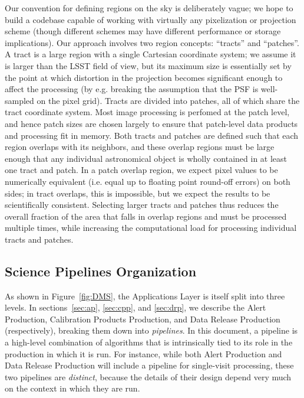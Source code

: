 Our convention for defining regions on the sky is deliberately vague; we hope to build a codebase capable of working with virtually any pixelization or projection scheme (though different schemes may have different performance or storage implications).  Our approach involves two region concepts: ``tracts'' and ``patches''.  A tract is a large region with a single Cartesian coordinate system; we assume it is larger than the LSST field of view, but its maximum size is essentially set by the point at which distortion in the projection becomes significant enough to affect the processing (by e.g. breaking the assumption that the PSF is well-sampled on the pixel grid).  Tracts are divided into patches, all of which share the tract coordinate system.  Most image processing is perfomed at the patch level, and hence patch sizes are chosen largely to ensure that patch-level data products and processing fit in memory.  Both tracts and patches are defined such that each region overlaps with its neighbors, and these overlap regions must be large enough that any individual astronomical object is wholly contained in at least one tract and patch.  In a patch overlap region, we expect pixel values to be numerically equivalent (i.e. equal up to floating point round-off errors) on both sides; in tract overlaps, this is impossible, but we expect the results to be scientifically consistent.  Selecting larger tracts and patches thus reduces the overall fraction of the area that falls in overlap regions and must be processed multiple times, while increasing the computational load for processing individual tracts and patches.

\subsection{Science Pipelines Organization}

As shown in Figure~\ref{fig:DMS}, the Applications Layer is itself split into three levels.  In sections~\ref{sec:ap}, \ref{sec:cpp}, and \ref{sec:drp}, we describe the Alert Production, Calibration Products Production, and Data Release Production (respectively), breaking them down into \emph{pipelines}.  In this document, a pipeline is a high-level combination of algorithms that is intrinsically tied to its role in the production in which it is run.  For instance, while both Alert Production and Data Release Production will include a pipeline for single-visit processing, these two pipelines are \emph{distinct}, because the details of their design depend very much on the context in which they are run.

